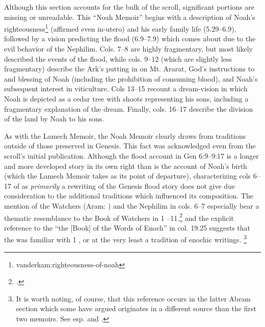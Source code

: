 Although this section accounts for the bulk of the scroll, significant portions are missing or unreadable. This ``Noah Memoir'' begins with a description of Noah's righteousness\footnote{vanderkam:righteousness-of-noah} (affirmed even in-utero) and his early family life (5.29--6.9), followed by a vision predicting the flood (6.9--7.9) which comes about due to the evil behavior of the Nephilim. Cols. 7--8 are highly fragmentary, but most likely described the events of the flood, while cols. 9--12 (which are slightly less fragmentary) describe the Ark's putting in on Mt. Ararat, God's instructions to  and blessing of Noah (including the prohibition of consuming blood), and Noah's subsequent interest in viticulture. Cols 13--15 recount a dream-vision in which Noah is depicted as a cedar tree with shoots representing his sons, including a fragmentary explanation of the dream. Finally, cols. 16--17 describe the division of the land by Noah to his sons.

As with the Lamech Memoir, the Noah Memoir clearly draws from traditions outside of those preserved in Genesis. This fact was acknowledged even from the scroll's initial publication.\autocite[38]{avigad-yadin1956} Although the flood account in Gen 6:9--9:17 is a longer and more developed story in its own right than is the account of Noah's birth (which the Lamech Memoir takes as its point of departure), characterizing cols 6--17 of \ga as \emph{primarily} a rewriting of the Genesis flood story does not give due consideration to the additional traditions which influenced its composition. The mention of the Watchers (Aram: ) and the Nephilim in cols. 6--7 especially bear a thematic resemblance to the Book of Watchers in 1 --11.\footnote{\cite[174]{nickelsburg2005}.} and the explicit reference to the ``the [Book] of the Words of Enoch'' in col. 19.25 suggests that the \ga was familiar with 1 \enoch, or at the very least a tradition of enochic writings.%
%
\footnote{It is worth noting, of course, that this reference occurs in the latter Abram section which some have argued originates in a different source than the first two memoirs. See esp. \cite{bernstein_berthelot-etal2010} and \cite{bernstein_as2010}.}

